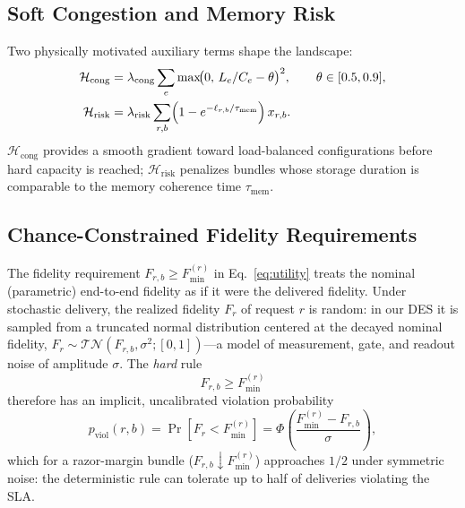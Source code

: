 \documentclass[twocolumn]{article}
\newcommand{\calH}{\mathcal{H}}
\begin{document}
\subsection{Soft Congestion and Memory Risk}
\label{sec:congestion-risk}

Two physically motivated auxiliary terms shape the landscape:
\begin{align}
  \calH_{\text{cong}} &= \lambda_{\text{cong}} \sum_e
    \max\!\bigl(0,\, L_e/C_e - \theta\bigr)^2, \qquad
    \theta \in [0.5, 0.9],\\
  \calH_{\text{risk}} &= \lambda_{\text{risk}} \sum_{r,b}
    \Bigl(1 - e^{-\ell_{r,b}/\tau_{\text{mem}}}\Bigr)\, x_{r,b}.
\end{align}
$\calH_{\text{cong}}$ provides a smooth gradient toward load-balanced
configurations before hard capacity is reached; $\calH_{\text{risk}}$
penalizes bundles whose storage duration is comparable to the memory
coherence time $\tau_{\text{mem}}$.

\subsection{Chance-Constrained Fidelity Requirements}
\label{sec:chance-form}

The fidelity requirement $F_{r,b} \ge F_{\min}^{(r)}$ in
Eq.~\eqref{eq:utility} treats the nominal (parametric) end-to-end
fidelity as if it were the delivered fidelity.  Under stochastic
delivery, the realized fidelity $F_r$ of request $r$ is random: in our
DES it is sampled from a truncated normal distribution centered at the
decayed nominal fidelity,
$F_r \sim \mathcal{TN}(F_{r,b}, \sigma^2; [0,1])$---a model of
measurement, gate, and readout noise of amplitude $\sigma$.  The
\emph{hard} rule
\begin{equation}
  \label{eq:hard}
  F_{r,b} \ge F_{\min}^{(r)}
\end{equation}
therefore has an implicit, uncalibrated violation probability
\begin{equation}
  \label{eq:pviol}
  p_{\text{viol}}(r,b) = \Pr[F_r < F_{\min}^{(r)}]
    = \Phi\!\left(\frac{F_{\min}^{(r)} - F_{r,b}}{\sigma}\right),
\end{equation}
which for a razor-margin bundle ($F_{r,b} \downarrow F_{\min}^{(r)}$)
approaches $1/2$ under symmetric noise: the deterministic rule can
tolerate up to half of deliveries violating the SLA.
\end{document}
